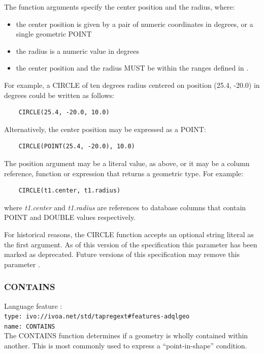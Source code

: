 \documentclass[11pt,a4paper]{ivoa}
\begin{document}
The function arguments specify the center position and the radius, where:
\begin{itemize}
    \item the center position is given by a pair of numeric coordinates
    in degrees, or a single geometric POINT
    \item the radius is a numeric value in degrees
    \item the center position and the radius MUST be within the ranges defined in
    .
\end{itemize}

For example, a CIRCLE of ten degrees radius centered on position
(25.4, -20.0) in degrees could be written as follows:
\begin{verbatim}
    CIRCLE(25.4, -20.0, 10.0)
\end{verbatim}

Alternatively, the center position may be expressed as a POINT:
\begin{verbatim}
    CIRCLE(POINT(25.4, -20.0), 10.0)
\end{verbatim}

The position argument may be a literal value, as above, or it may be a
column reference, function or expression that returns a geometric type.
For example:
\begin{verbatim}
    CIRCLE(t1.center, t1.radius)
\end{verbatim}
where \textit{t1.center} and \textit{t1.radius} are references to
database columns that contain POINT and DOUBLE values respectively.

For historical reasons, the CIRCLE function accepts an optional string literal
as the first argument.
As of this version of the specification this parameter has been
marked as deprecated.
Future versions of this specification may remove this parameter
.

\subsubsection{CONTAINS}
\label{sec:functions.geom.contains}
{\footnotesize Language feature :}\\
{\footnotesize \verb|type: ivo://ivoa.net/std/tapregext#features-adqlgeo|}\\
{\footnotesize \verb|name: CONTAINS|}\\

The CONTAINS function determines if a geometry is wholly contained within
another. This is most commonly used to express a ``point-in-shape'' condition.
\end{document}
